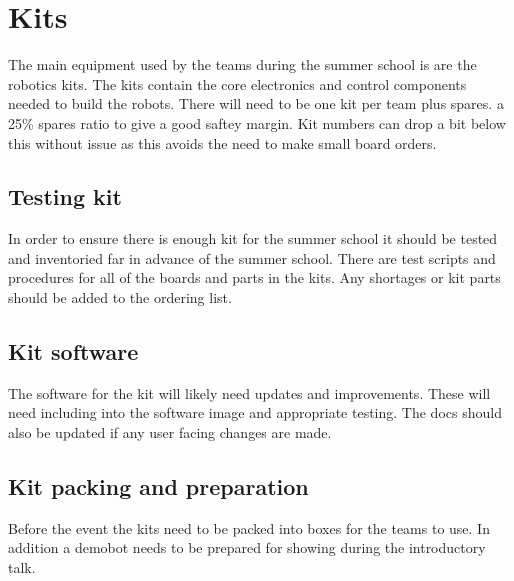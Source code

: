 \section{Kits}

The main equipment used by the teams during the summer school is are the robotics kits.
The kits contain the core electronics and control components needed to build the robots.
There will need to be one kit per team plus spares. a 25\% spares ratio to give a good saftey margin.
Kit numbers can drop a bit below this without issue as this avoids the need to make small board orders.

\subsection{Testing kit}

In order to ensure there is enough kit for the summer school it should be tested and inventoried far in advance of the summer school.
There are test scripts and procedures for all of the boards and parts in the kits.
Any shortages or kit parts should be added to the ordering list.


\subsection{Kit software}

The software for the kit will likely need updates and improvements.
These will need including into the software image and appropriate testing.
The docs should also be updated if any user facing changes are made.


\subsection{Kit packing and preparation}

Before the event the kits need to be packed into boxes for the teams to use.
In addition a demobot needs to be prepared for showing during the introductory talk.

